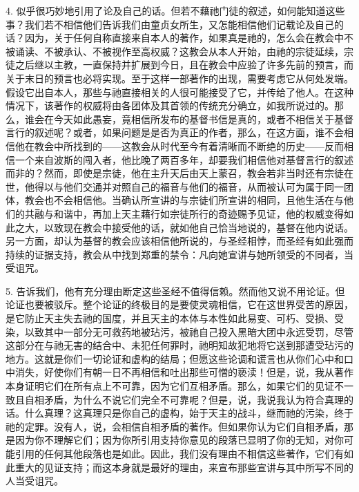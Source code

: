4. 似乎很巧妙地引用了论及自己的话。但若不藉祂门徒的叙述，如何能知道这些事？我们若不相信他们告诉我们由童贞女所生，又怎能相信他们记载论及自己的话？因为，关于任何自称直接来自本人的著作，如果真是祂的，怎么会在教会中不被诵读、不被承认、不被视作至高权威？这教会从本人开始，由祂的宗徒延续，宗徒之后继以主教，一直保持并扩展到今日，且在教会中应验了许多先前的预言，而关于末日的预言也必将实现。至于这样一部著作的出现，需要考虑它从何处发端。假设它出自本人，那些与祂直接相关的人很可能接受了它，并传给了他人。在这种情况下，该著作的权威将由各团体及其首领的传统充分确立，如我所说过的。那么，谁会在今天如此愚妄，竟相信所发布的基督书信是真的，或者不相信关于基督言行的叙述呢？或者，如果问题是是否为真正的作者，那么，在这方面，谁不会相信他在教会中所找到的——这教会从时代至今有着清晰而不断绝的历史——反而相信一个来自波斯的闯入者，他比晚了两百多年，却要我们相信他对基督言行的叙述而非的？然而，即使是宗徒，他在主升天后由天上蒙召，教会若非当时还有宗徒在世，他得以与他们交通并对照自己的福音与他们的福音，从而被认可为属于同一团体，教会也不会相信他。当确认所宣讲的与宗徒们所宣讲的相同，且他生活在与他们的共融与和谐中，再加上天主藉行如宗徒所行的奇迹赐予见证，他的权威变得如此之大，以致现在教会中接受他的话，就如他自己恰当地说的，基督在他内说话。另一方面，却认为基督的教会应该相信他所说的，与圣经相悖，而圣经有如此强而持续的证据支持，教会从中找到郑重的禁令：凡向她宣讲与她所领受的不同者，当受诅咒。\par

5. 告诉我们，他有充分理由断定这些圣经不值得信赖。然而他又说不用论证。但论证也要被驳斥。整个论证的终极目的是要使灵魂相信，它在这世界受苦的原因，是它防止天主失去祂的国度，并且天主的本体与本性如此易变、可朽、受损、受染，以致其中一部分无可救药地被玷污，被祂自己投入黑暗大团中永远受罚，尽管这部分在与祂无害的结合中、未犯任何罪时，祂明知故犯地将它送到那遭受玷污的地方。这就是你们一切论证和虚构的结局；但愿这些论调和谎言也从你们心中和口中消失，好使你们有朝一日不再相信和吐出那些可憎的亵渎！但是，说，我从著作本身证明它们在所有点上不可靠，因为它们互相矛盾。那么，如果它们的见证不一致且自相矛盾，为什么不说它们完全不可靠呢？但是，说，我说我认为符合真理的话。什么真理？这真理只是你自己的虚构，始于天主的战斗，继而祂的污染，终于祂的定罪。没有人，说，会相信自相矛盾的著作。但如果你认为它们自相矛盾，那是因为你不理解它们；因为你所引用支持你意见的段落已显明了你的无知，对你可能引用的任何其他段落也是如此。因此，我们没有理由不相信这些著作，它们有如此重大的见证支持；而这本身就是最好的理由，来宣布那些宣讲与其中所写不同的人当受诅咒。\par

